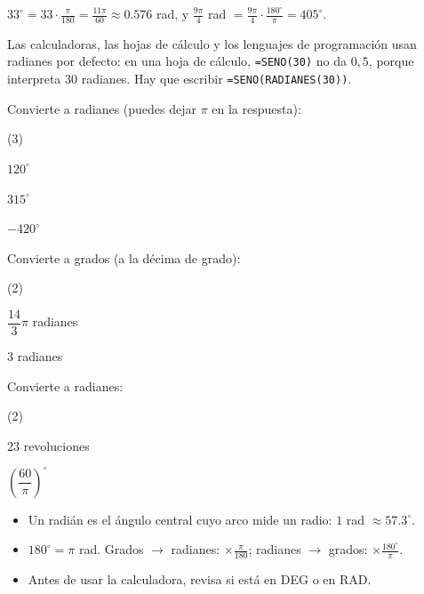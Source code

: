 \documentclass[11pt]{article}
\begin{document}
\begin{ejemplo}[Conversiones]
$33^\circ = 33\cdot\frac{\pi}{180} = \frac{11\pi}{60} \approx \num{0,576}$ rad, y
$\frac{9\pi}{4}$ rad $= \frac{9\pi}{4}\cdot\frac{180^\circ}{\pi} = 405^\circ$.
\end{ejemplo}

\begin{aplicacion}
Las calculadoras, las hojas de cálculo y los lenguajes de programación usan
radianes por defecto: en una hoja de cálculo, \texttt{=SENO(30)} no da $0{,}5$,
porque interpreta $30$ radianes. Hay que escribir \texttt{=SENO(RADIANES(30))}.
\end{aplicacion}

\begin{preguntas}
\pregunta Convierte a radianes (puedes dejar $\pi$ en la respuesta):
\begin{opciones*}(3)
  \item $120^\circ$
  \item $315^\circ$
  \item $-420^\circ$
\end{opciones*}
\espacio{2cm}
\pregunta Convierte a grados (a la décima de grado):
\begin{opciones*}(2)
  \item $\dfrac{14}{3}\pi$ radianes
  \item $3$ radianes
\end{opciones*}
\espacio{2cm}
\pregunta Convierte a radianes:
\begin{opciones*}(2)
  \item $23$ revoluciones
  \item $\left(\dfrac{60}{\pi}\right)^\circ$
\end{opciones*}
\espacio{2cm}
\end{preguntas}

\begin{resumen}
\begin{itemize}
  \item Un radián es el ángulo central cuyo arco mide un radio: $1$ rad $\approx \num{57,3}^\circ$.
  \item $180^\circ = \pi$ rad. Grados $\to$ radianes: $\times\frac{\pi}{180}$; radianes $\to$ grados: $\times\frac{180^\circ}{\pi}$.
  \item Antes de usar la calculadora, revisa si está en DEG o en RAD.
\end{itemize}
\end{resumen}
\end{document}
